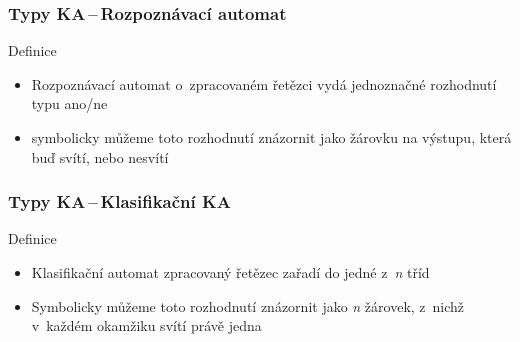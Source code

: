 \documentclass[hyperref={unicode}]{beamer}
\begin{document}
\begin{frame}
\transblindshorizontal
\frametitle{Typy KA\,--\,Rozpoznávací automat}
\begin{block}{Definice}
\begin{itemize}
\item{Rozpoznávací automat o~zpracovaném řetězci vydá jednoznačné rozhodnutí typu ano/ne}
\item{symbolicky můžeme toto rozhodnutí znázornit jako žárovku na výstupu, která buď svítí, nebo nesvítí}
\end{itemize}
\end{block}
\begin{figure}[h]
		\centering
\end{figure}
\end{frame}
\begin{frame}
\transblindshorizontal
\frametitle{Typy KA\,--\,Klasifikační KA}
\begin{block}{Definice}
\begin{itemize}
\item{Klasifikační automat zpracovaný řetězec zařadí do jedné z~\textit{n} tříd}
\item{Symbolicky můžeme toto rozhodnutí znázornit jako \textit{n} žárovek, z~nichž v~každém okamžiku svítí právě jedna}
\end{itemize}
\end{block}
\begin{figure}[h]
		\centering
\end{figure}
\end{frame}
\end{document}
